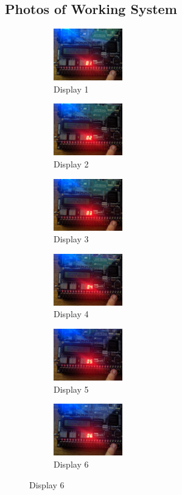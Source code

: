 \documentclass[10pt,a4paper]{article}
\begin{document}
		\subsection{Photos of Working System}
		\begin{figure}[H]

			\begin{subfigure}{3cm}
				\centering\includegraphics[width=3cm]{Display1.jpg}
				\caption{Display 1}
			\end{subfigure}
			\begin{subfigure}{3cm}
				\centering\includegraphics[width=3cm]{Display2.jpg}
				\caption{Display 2}
			\end{subfigure}
			\begin{subfigure}{3cm}
				\centering\includegraphics[width=3cm]{Display3.jpg}
				\caption{Display 3}
			\end{subfigure}
		
			\begin{subfigure}{3cm}
				\centering\includegraphics[width=3cm]{Display4.jpg}
				\caption{Display 4}
			\end{subfigure}	
			\begin{subfigure}{3cm}
				\centering\includegraphics[width=3cm]{Display5.jpg}
				\caption{Display 5}
			\end{subfigure}		
			\begin{subfigure}{3cm}
				\centering\includegraphics[width=3cm]{Display6.jpg}
				\caption{Display 6}
				

\end{subfigure}
\end{figure}
\end{document}
